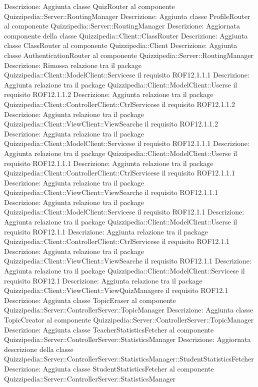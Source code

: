 Descrizione: Aggiunta classe QuizRouter al componente Quizzipedia::Server::RoutingManager 
Descrizione: Aggiunta classe ProfileRouter al componente Quizzipedia::Server::RoutingManager 
Descrizione: Aggiornata componente della classe Quizzipedia::Client::ClassRouter 
Descrizione: Aggiunta classe ClassRouter al componente Quizzipedia::Client 
Descrizione: Aggiunta classe AuthenticationRouter al componente Quizzipedia::Server::RoutingManager 
Descrizione: Rimossa relazione tra il package Quizzipedia::Client::ModelClient::Servicese il requisito ROF12.1.1.1 
Descrizione: Aggiunta relazione tra il package Quizzipedia::Client::ModelClient::Userse il requisito ROF12.1.1.2 
Descrizione: Aggiunta relazione tra il package Quizzipedia::Client::ControllerClient::CtrlServicese il requisito ROF12.1.1.2 
Descrizione: Aggiunta relazione tra il package Quizzipedia::Client::ViewClient::ViewSearche il requisito ROF12.1.1.2 
Descrizione: Aggiunta relazione tra il package Quizzipedia::Client::ModelClient::Servicese il requisito ROF12.1.1.1 
Descrizione: Aggiunta relazione tra il package Quizzipedia::Client::ModelClient::Userse il requisito ROF12.1.1.1 
Descrizione: Aggiunta relazione tra il package Quizzipedia::Client::ControllerClient::CtrlServicese il requisito ROF12.1.1.1 
Descrizione: Aggiunta relazione tra il package Quizzipedia::Client::ViewClient::ViewSearche il requisito ROF12.1.1.1 
Descrizione: Aggiunta relazione tra il package Quizzipedia::Client::ModelClient::Servicese il requisito ROF12.1.1 
Descrizione: Aggiunta relazione tra il package Quizzipedia::Client::ModelClient::Userse il requisito ROF12.1.1 
Descrizione: Aggiunta relazione tra il package Quizzipedia::Client::ControllerClient::CtrlServicese il requisito ROF12.1.1 
Descrizione: Aggiunta relazione tra il package Quizzipedia::Client::ViewClient::ViewSearche il requisito ROF12.1.1 
Descrizione: Aggiunta relazione tra il package Quizzipedia::Client::ModelClient::Servicese il requisito ROF12.1 
Descrizione: Aggiunta relazione tra il package Quizzipedia::Client::ViewClient::ViewQuizManagere il requisito ROF12.1 
Descrizione: Aggiunta classe TopicEraser al componente Quizzipedia::Server::ControllerServer::TopicManager 
Descrizione: Aggiunta classe TopicCreator al componente Quizzipedia::Server::ControllerServer::TopicManager 
Descrizione: Aggiunta classe TeacherStatisticsFetcher al componente Quizzipedia::Server::ControllerServer::StatisticsManager 
Descrizione: Aggiornata descrizione della classe Quizzipedia::Server::ControllerServer::StatisticsManager::StudentStatisticsFetcher 
Descrizione: Aggiunta classe StudentStatisticsFetcher al componente Quizzipedia::Server::ControllerServer::StatisticsManager 
